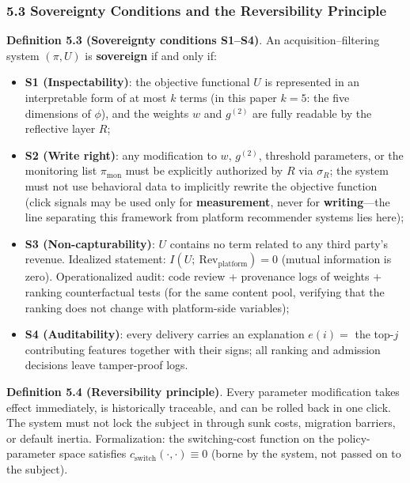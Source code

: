 \documentclass[
  11pt]{article}
\providecommand{\tightlist}{%
  \setlength{\itemsep}{0pt}\setlength{\parskip}{0pt}}
\begin{document}
\subsubsection{5.3 Sovereignty Conditions and the Reversibility
Principle}\label{sovereignty-conditions-and-the-reversibility-principle}

\textbf{Definition 5.3 (Sovereignty conditions S1--S4)}. An
acquisition--filtering system \((\pi, U)\) is \textbf{sovereign} if and
only if:

\begin{itemize}
\tightlist
\item
  \textbf{S1 (Inspectability)}: the objective functional \(U\) is
  represented in an interpretable form of at most \(k\) terms (in this
  paper \(k = 5\): the five dimensions of \(\phi\)), and the weights
  \(w\) and \(g^{(2)}\) are fully readable by the reflective layer
  \(R\);
\item
  \textbf{S2 (Write right)}: any modification to \(w\), \(g^{(2)}\),
  threshold parameters, or the monitoring list \(\pi_{\mathrm{mon}}\)
  must be explicitly authorized by \(R\) via \(\sigma_R\); the system
  must not use behavioral data to implicitly rewrite the objective
  function (click signals may be used only for \textbf{measurement},
  never for \textbf{writing}---the line separating this framework from
  platform recommender systems lies here);
\item
  \textbf{S3 (Non-capturability)}: \(U\) contains no term related to any
  third party's revenue. Idealized statement:
  \(I(U;\ \mathrm{Rev}_{\mathrm{platform}}) = 0\) (mutual information is
  zero). Operationalized audit: code review + provenance logs of weights
  + ranking counterfactual tests (for the same content pool, verifying
  that the ranking does not change with platform-side variables);
\item
  \textbf{S4 (Auditability)}: every delivery carries an explanation
  \(e(i) =\) the top-\(j\) contributing features together with their
  signs; all ranking and admission decisions leave tamper-proof logs.
\end{itemize}

\textbf{Definition 5.4 (Reversibility principle)}. Every parameter
modification takes effect immediately, is historically traceable, and
can be rolled back in one click. The system must not lock the subject in
through sunk costs, migration barriers, or default inertia.
Formalization: the switching-cost function on the policy-parameter space
satisfies \(c_{\mathrm{switch}}(\cdot,\cdot) \equiv 0\) (borne by the
system, not passed on to the subject).
\end{document}
